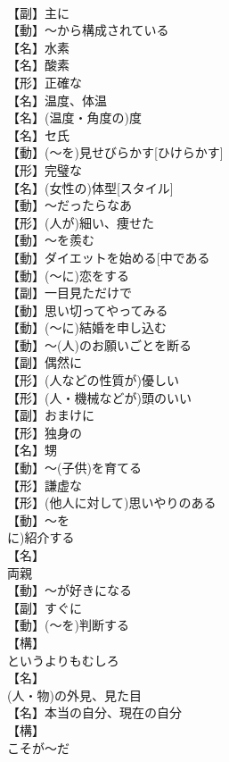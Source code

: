 \documentclass[8pt]{extreport}
\begin{document}
\begin{CJK}{UTF8}{min}
\\	【副】主に
\\	【動】～から構成されている
\\	【名】水素
\\	【名】酸素
\\	【形】正確な
\\	【名】温度、体温
\\	【名】(温度・角度の)度
\\	【名】セ氏
\\	【動】(～を)見せびらかす[ひけらかす]
\\	【形】完璧な
\\	【名】(女性の)体型[スタイル]
\\	【動】～だったらなあ
\\	【形】(人が)細い、痩せた
\\	【動】～を羨む
\\	【動】ダイエットを始める[中である
\\	【動】(～に)恋をする
\\	【副】一目見ただけで
\\	【動】思い切ってやってみる
\\	【動】(～に)結婚を申し込む
\\	【動】～(人)のお願いごとを断る
\\	【副】偶然に
\\	【形】(人などの性質が)優しい
\\	【形】(人・機械などが)頭のいい
\\	【副】おまけに
\\	【形】独身の
\\	【名】甥
\\	【動】～(子供)を育てる
\\	【形】謙虚な
\\	【形】(他人に対して)思いやりのある
\\	【動】～を
\\	に)紹介する
\\	【名】
\\	両親
\\	【動】～が好きになる
\\	【副】すぐに
\\	【動】(～を)判断する
\\	【構】
\\	というよりもむしろ
\\	【名】
\\	(人・物)の外見、見た目
\\	【名】本当の自分、現在の自分
\\	【構】
\\	こそが～だ

\end{CJK}
\end{document}
